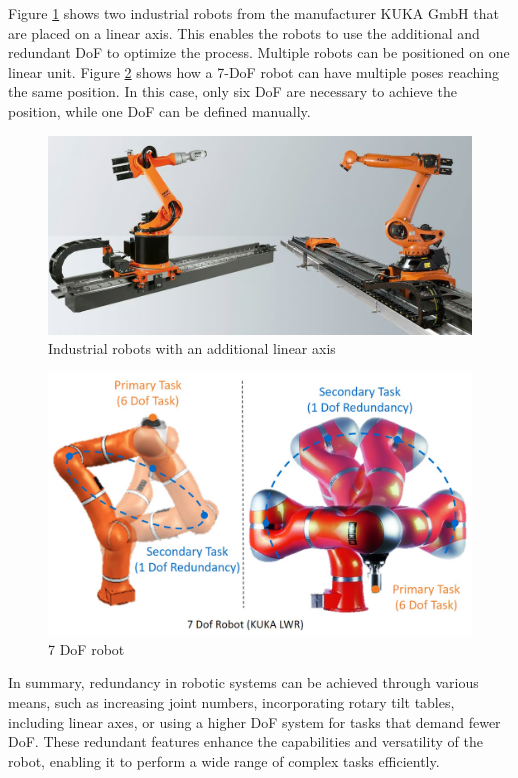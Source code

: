 Figure \ref{linear} shows two industrial robots from the manufacturer KUKA GmbH that are placed on a linear axis. This enables the robots to use the additional and redundant DoF to optimize the process. Multiple robots can be positioned on one linear unit. 
Figure \ref{seven} shows how a 7-DoF robot can have multiple poses reaching the same position. In this case, only six DoF are necessary to achieve the position, while one DoF can be defined manually.

\begin{figure}[H]
	\centerline{\includegraphics[scale=.4]{figures/linear.png}}
	\caption{Industrial robots with an additional linear axis~\cite{linear}}
	\label{linear}
\end{figure}

\begin{figure}[H]
	\centerline{\includegraphics[scale=.14]{figures/red.png}}
	\caption{7 DoF robot~\cite{Hagane.2022}}
	\label{seven}
\end{figure}

In summary, redundancy in robotic systems can be achieved through various means, such as increasing joint numbers, incorporating rotary tilt tables, including linear axes, or using a higher DoF system for tasks that demand fewer DoF. These redundant features enhance the capabilities and versatility of the robot, enabling it to perform a wide range of complex tasks efficiently.

